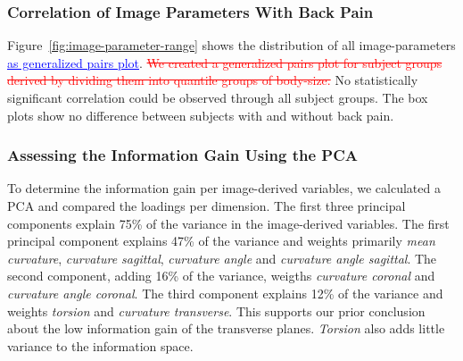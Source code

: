 \documentclass[a4paper,twoside]{style/article}
\newcommand{\rem}[1]{\textcolor{red}{\sout{#1}}}
\newcommand{\add}[1]{\textcolor{blue}{\uline{#1}}}
\begin{document}
\subsubsection{Correlation of Image Parameters With Back Pain}
Figure~\ref{fig:image-parameter-range} shows the distribution of all image-parameters \add{as generalized pairs plot}.
\rem{We created a generalized pairs plot for subject groups derived by dividing them into quantile groups of body-size.}
No statistically significant correlation could be observed through all subject groups.
The box plots show no difference between subjects with and without back pain.

\subsubsection{Assessing the Information Gain Using the PCA}
To determine the information gain per image-derived variables, we calculated a PCA and compared the loadings per dimension.
The first three principal components explain 75\% of the variance in the image-derived variables.
The first principal component explains 47\% of the variance and weights primarily \emph{mean curvature}, \emph{curvature sagittal}, \emph{curvature angle} and \emph{curvature angle sagittal}.
The second component, adding 16\% of the variance, weigths  \emph{curvature coronal} and \emph{curvature angle coronal}.
The third component explains 12\% of the variance and weights \emph{torsion} and \emph{curvature transverse}.
This supports our prior conclusion about the low information gain of the transverse planes.
\emph{Torsion} also adds little variance to the information space.
\end{document}
